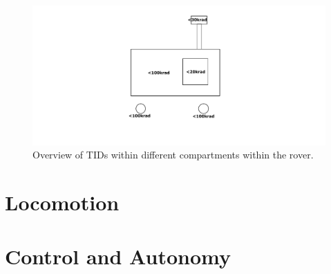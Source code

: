 \begin{figure}[htb]
     \centering
     \includegraphics[width=\textwidth]{Media/RadiationOverview}
     \caption{Overview of TIDs within different compartments within the rover.}
     \label{fig:RadiationOverview}
\end{figure}

\clearpage

\section{Locomotion}
\label{sec:locomotion}



\section{Control and Autonomy}
\label{sec:ControlandAutonomy}

\cleardoublepage